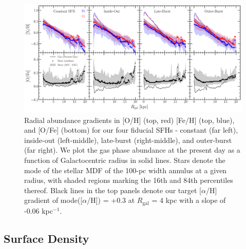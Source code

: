 \documentclass[a4paper, fleqn, usenatbib, useAMS]{mnras}
\begin{document}
\begin{figure} 
\centering 
\includegraphics[scale = 0.32]{metallicity_gradient.pdf} 
\caption{Radial abundance gradients in [O/H] (top, red) [Fe/H] (top, blue), 
and [O/Fe] (bottom) for our four fiducial SFHs - constant (far left), 
inside-out (left-middle), late-burst (right-middle), and outer-burst (far 
right). We plot the gas phase abundance at the present day as a function of 
Galactocentric radius in solid lines. Stars denote the mode of the stellar 
MDF of the 100-pc width annulus at a given radius, with shaded regions 
marking the 16th and 84th percentiles thereof. Black lines in the top panels 
denote our target [$\alpha$/H] gradient of mode([$\alpha$/H]) = +0.3 at 
$R_\text{gal}$ = 4 kpc with a slope of -0.06 kpc$^{-1}$. } 
\label{fig:metallicity_gradient} 
\end{figure} 

\subsection{Surface Density} 
\label{sec:gradients:density} 
\end{document}
